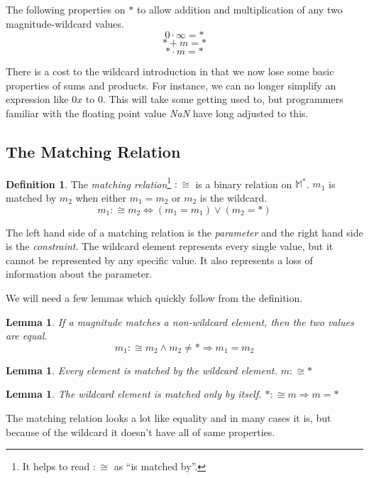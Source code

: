 \documentclass[twoside]{article}
\newcommand{\quotes}[1]{``#1''}
\theoremstyle{plain}%
\newtheorem{lemma}[theorem]{Lemma}
\theoremstyle{definition}
\newtheorem{definition}{Definition}[section]
\theoremstyle{remark}
\begin{document}
The following properties on \(\ast\) to allow addition and multiplication of any two magnitude-wildcard values.
\[0 \cdot \infty = \ast\]
\[\ast + m = \ast\]
\[\ast \cdot m = \ast\]

There is a cost to the wildcard introduction in that we now lose some basic properties of sums and products. For instance, we can no longer simplify an expression like \(0x\) to \(0\). This will take some getting used to, but programmers familiar with the floating point value \textit{NaN} have long adjusted to this.

\subsection{The Matching Relation}

\begin{definition}
The \textit{matching relation}\footnote{It helps to read \(:\cong\) as \quotes{is matched by}.} \(:\cong\) is a binary relation on \(\mathbb{M}^*\). \(m_1\) is matched by \(m_2\) when either \(m_1 = m_2\) or  \(m_2\) is the wildcard.
\[m_1 :\cong m_2 \Longleftrightarrow (m_1 = m_1) \vee (m_2 = \ast)\]
\end{definition}

The left hand side of a matching relation is the \textit{parameter} and the right hand side is the \textit{constraint}. The wildcard element represents every single value, but it cannot be represented by any specific value. It also represents a loss of information about the parameter.

We will need a few lemmas which quickly follow from the definition.

\begin{lemma}
\label{wild_prop_1} If a magnitude matches a non-wildcard element, then the two values are equal. \[m_1 :\cong m_2 \wedge m_2 \neq \ast \Longrightarrow m_1 = m_2\]
\end{lemma}

\begin{lemma}
\label{wild_prop_2}
Every element is matched by the wildcard element. \(m :\cong \ast\)
\end{lemma}

\begin{lemma}
\label{wild_prop_3}
The wildcard element is matched only by itself. \(\ast :\cong m \Longrightarrow m = \ast\)
\end{lemma}

The matching relation looks a lot like equality and in many cases it is, but because of the wildcard it doesn't have all of same properties.
\end{document}

